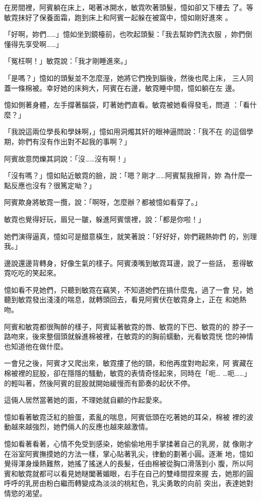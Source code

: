 在房間裡，阿賓躺在床上，喝著冰開水，敏霓吹著頭髮，憶如卻又下樓去
了。等敏霓抹好了保養面霜，跑到床上和阿賓一起躲在被窩中，憶如剛好進來
。

「好啊，妳們……」憶如坐到鏡檯前，也吹起頭髮：「我去幫妳們洗衣服
，妳們倒懂得先享受啊……」

「冤枉啊！」敏霓說：「我才剛睡進來。」

「是嗎？」憶如的頭髮並不怎麼溼，她將它們挽到腦後，然後也爬上床，
三人同蓋一條棉被。幸好她的床夠大，阿賓在右邊，敏霓睡中間，憶如躺在左
邊。

憶如側著身體，左手撐著腦袋，盯著她們直看。敏霓被她看得發毛，問道
：「看什麼？」

「我說這兩位學長和學妹啊，」憶如用洞燭其奸的眼神逼問說：「我不在
的這個學期，妳們有沒有作出對不起我的事啊？」

阿賓故意閃爍其詞說：「沒……沒有啊！」

「沒有嗎？」憶如貼近敏霓的臉，說：「嗯？剛才……阿賓幫我擦背，妳
為什麼一點反應也沒有？很篤定呦？」

阿賓欺身將敏霓一攬，說：「啊呀，怎麼辦？都被憶如看穿了。」

敏霓也覺得好玩，眉兒一皺，躲進阿賓懷裡，說：「都是你啦！」

她們演得逼真，憶如可是醋意橫生，就笑著說：「好好好，妳們親熱妳們
的，別理我。」

邊說還邊背轉身，好像生氣的樣子。阿賓湊嘴到敏霓耳邊，說了一些話，
惹得敏霓吃吃的笑起來。

憶如看不見她們，只聽到敏霓在竊笑，不知道她們在搞什麼鬼，過了一會
兒，她聽到敏霓發出淺淺的喘息，就轉頭回去，看見阿賓伏在敏霓身上，正在
和她熱吻。

阿賓和敏霓都很陶醉的樣子，阿賓延著敏霓的唇、敏霓的下巴、敏霓的的
脖子一路吻來，後來整個頭就躲進棉被裡，在敏霓的的胸前蠕動，光看敏霓恍
惚的神情也知道他在做什麼。

一會兒之後，阿賓才又爬出來，敏霓摟了他的頸，和他再度對吻起來，阿
賓藏在棉被裡的屁股，卻在隱隱的騷動，敏霓的表情奇怪起來，同時在「呃…
…呃……」的輕叫著，然後阿賓的屁股就開始緩慢而有節奏的起伏不停。

這倆人居然當著她的面，不理她就自顧的作起愛來。

憶如看著敏霓泛紅的臉蛋，紊亂的喘息，阿賓低頭在吃著她的耳朵，棉被
裡的波動越來越強烈，她們倆人的反應也越來越激情。

憶如看著看著，心情不免受到感染，她偷偷地用手掌揉著自己的乳房，就
像剛才在浴室阿賓撫摸她的方法一樣，掌心貼著乳尖，律動的劃著小圓。逐漸
地，憶如覺得渾身燥熱難熬，她搖了搖迷人的長髮，任由棉被從胸口滑落到小
腹，所以阿賓和敏霓就都可以看見她瞇闔著媚眼，右手在自己的雙峰間捏來握
去，她那的圓呼呼的乳房由粉白繼而轉變成為淡淡的桃紅色，乳尖勇敢的向前
突出，表達她對情慾的渴望。

